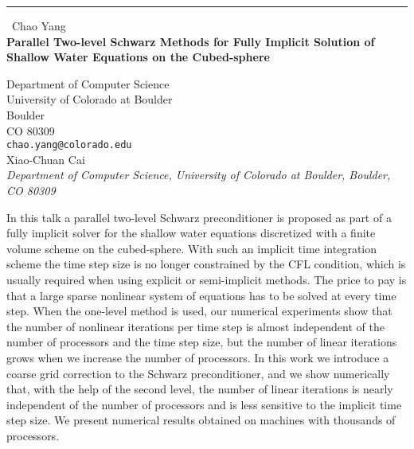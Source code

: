\documentclass{report}
\begin{document}
\begin{center}
\rule{6in}{1pt} \
{\large Chao Yang \\
{\bf Parallel Two-level Schwarz Methods for Fully Implicit Solution of Shallow Water Equations on the Cubed-sphere}}

Department of Computer Science \\ University of Colorado at Boulder \\ Boulder \\ CO 80309
\\
{\tt chao.yang@colorado.edu}\\
Xiao-Chuan Cai\\
{\em Department of Computer Science, University of Colorado at Boulder, Boulder, CO 80309}\end{center}

In this talk a parallel two-level Schwarz preconditioner is proposed as
part of a fully implicit solver for the shallow water equations
discretized with a finite volume scheme on the cubed-sphere. With such an
implicit time integration scheme the time step size is no longer
constrained by the CFL condition, which is usually required when using
explicit or semi-implicit methods. The price to pay is that a large
sparse nonlinear system of equations has to be solved at every time step.
When the one-level method is used, our numerical experiments show that
the number of nonlinear iterations per time step is almost independent of
the number of processors and the time step size, but the number of linear
iterations grows when we increase the number of processors. In this work
we introduce a coarse grid correction to the Schwarz preconditioner, and
we show numerically that, with the help of the second level, the number
of linear iterations is nearly independent of the number of processors
and is less sensitive to the implicit time step size. We present
numerical results obtained on machines with thousands of processors.
\end{document}
